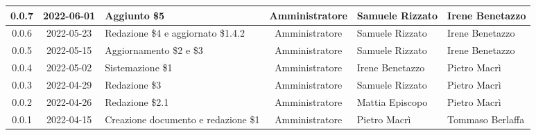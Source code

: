 \begin{center}
\begin{longtable}{ |c|c|p{8em}|c|m{5em}|m{6em}| }
		\hline
		0.0.7 & 2022-06-01 & Aggiunto \$5 & Amministratore & Samuele \newline Rizzato & Irene \newline Benetazzo \\
		\hline
		0.0.6 & 2022-05-23 & Redazione \$4 e aggiornato \$1.4.2 & Amministratore & Samuele \newline Rizzato & Irene \newline Benetazzo \\
		\hline
		0.0.5 & 2022-05-15 & Aggiornamento \$2 e \$3 & Amministratore & Samuele \newline Rizzato & Irene \newline Benetazzo \\
		\hline
		0.0.4 & 2022-05-02 & Sistemazione \$1 & Amministratore & Irene \newline Benetazzo & Pietro \newline Macrì\\
		\hline
		0.0.3 & 2022-04-29 & Redazione \$3 & Amministratore & Samuele \newline Rizzato & Pietro \newline Macrì\\
		\hline
		0.0.2 & 2022-04-26 & Redazione \$2.1 & Amministratore & Mattia \newline Episcopo & Pietro \newline Macrì\\
		\hline
		0.0.1 & 2022-04-15 & Creazione documento e redazione \$1 & Amministratore & Pietro \newline Macrì & Tommaso \newline Berlaffa\\
		\hline
	\end{longtable}
	\end{center}
	\newpage